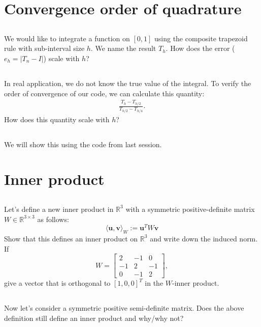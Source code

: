 \documentclass[11pt,letterpaper]{article}
\begin{document}
\section{Convergence order of quadrature}
\subsection{}
We would like to integrate a function on $[0,1]$ using the composite trapezoid rule with sub-interval size $h$. We name the result $T_h$. How does the error ($e_h = |T_n-I|$) scale with $h$?

\subsection{}
In real application, we do not know the true value of the integral. To verify the order of convergence of our code, we can calculate this quantity:
\begin{align*}
    \frac{T_h-T_{h/2}}{T_{h/2}-T_{h/4}}.
\end{align*}
How does this quantity scale with $h$?

\subsection{}
We will show this using the code from last session.

\section{Inner product}
\subsection{}
Let's define a new inner product in $\mathbb R^3$ with a symmetric
  positive-definite matrix $W\in \mathbb R^{3\times 3}$ as follows:
  $$
  \langle \boldsymbol u, \boldsymbol v\rangle_W := \boldsymbol u^T W \boldsymbol v
  $$
  Show that this defines an inner product on $\mathbb R^3$ and write
  down the induced norm. If 
  $$W=\begin{bmatrix}2& -1& 0 \\ -1 & 2 & -1
  \\ 0 & -1 & 2 \end{bmatrix},$$
  give a vector that is orthogonal to
  $[1,0,0]^T$ in the $W$-inner product.

\subsection{}
Now let's consider a symmetric positive
  semi-definite matrix. Does the above definition still define an
  inner product and why/why not?
  
\end{document}
